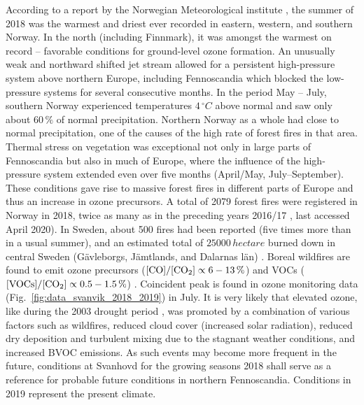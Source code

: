 \documentclass[bg, manuscript]{copernicus}
\begin{document}
According to a report by the Norwegian Meteorological institute \citep{MetNOR2019}, the summer of 2018 was the warmest and driest ever recorded in eastern, western, and southern Norway. In the north (including Finnmark), it was amongst the warmest on record -- favorable conditions for ground-level ozone formation.
An unusually weak and northward shifted jet stream allowed for a persistent high-pressure system above northern Europe, including Fennoscandia which blocked the low-pressure systems for several consecutive months. In the period May -- July, southern Norway experienced temperatures $4\,\unit{^\circ C}$ above normal and saw only about $60\,\unit{\%}$ of normal precipitation. Northern Norway as a whole had close to normal precipitation, one of the causes of the high rate of forest fires in that area.
Thermal stress on vegetation was exceptional not only in large parts of Fennoscandia but also in much of Europe, where the influence of the high-pressure system extended even over five months (April/May, July--September). These conditions gave rise to massive forest fires in different parts of Europe and thus an increase in ozone precursors.
A total of 2079 forest fires were registered in Norway in 2018, twice as many as in the preceding years 2016/17 \citep{DSB2019}, last accessed April 2020). In Sweden, about 500 fires had been reported (five times more than in a usual summer), and an estimated total of $25000\,\unit{hectare}$ burned down in central Sweden (G\"{a}vleborgs, J\"{a}mtlands, and Dalarnas l\"{a}n) \citep{SOU2019}. Boreal wildfires are found to emit ozone precursors  ($\chem{[CO]}/\chem{[CO_2]} \propto 6-13\,\unit{\%}$) and VOCs ($\chem{[VOCs]}/\chem{[CO_2]} \propto 0.5-1.5\,\unit{\%}$) \citep{AE:Cofer1990}. Coincident peak \chem{[O_3]} is found in ozone monitoring data (Fig.~\ref{fig:data_svanvik_2018_2019}) in July. It is very likely that elevated ozone, like during the 2003 drought period \citep{JGR:Solberg2018}, was promoted by a combination of various factors such as wildfires, reduced cloud cover (increased solar radiation), reduced dry deposition and turbulent mixing due to the stagnant weather conditions, and increased BVOC emissions. As such events may become more frequent in the future, conditions at Svanhovd for the growing seasons 2018 shall serve as a reference for probable future conditions in northern Fennoscandia. Conditions in 2019 represent the present climate.\\
\end{document}
